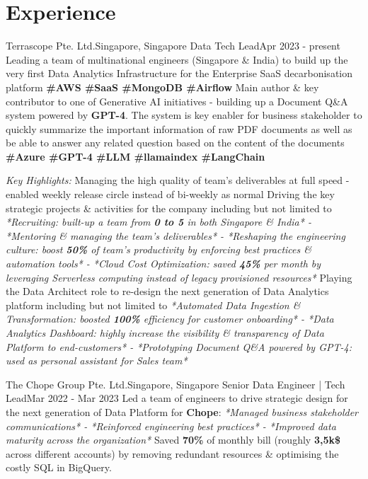 \section{Experience}
  \resumeSubHeadingListStart
    
    \resumeSubheading
      {Terrascope Pte. Ltd.}{Singapore, Singapore}
      {Data Tech Lead}{Apr 2023 - present}
      \resumeItemListStart
          {Leading a team of multinational engineers (Singapore \& India) to build up the very first Data Analytics Infrastructure for the Enterprise SaaS decarbonisation platform \textbf{\scriptsize{\#AWS \#SaaS \#MongoDB \#Airflow}}}
          {Main author \& key contributor to one of Generative AI initiatives - building up a Document Q\&A system powered by \textbf{GPT-4}. The system is key enabler for business stakeholder to quickly summarize the important information of raw PDF documents as well as be able to answer any related question based on the content of the documents \textbf{\scriptsize{\#Azure \#GPT-4 \#LLM \#llamaindex \#LangChain}}}
      \resumeItemListEnd
      
      \emph{Key Highlights:}
      \resumeItemListStart
          {Managing the high quality of team's deliverables at full speed - enabled weekly release circle instead of bi-weekly as normal}
          {Driving the key strategic projects \& activities for the company including but not limited to \emph{*Recruiting: built-up a team from \textbf{0 to 5} in both Singapore \& India* - *Mentoring \& managing the team's deliverables* - *Reshaping the engineering culture: boost \textbf{50\%} of team's productivity by enforcing best practices \& automation tools* - *Cloud Cost Optimization: saved \textbf{45\%} per month by leveraging Serverless computing instead of legacy provisioned resources*}}
          {Playing the Data Architect role to re-design the next generation of Data Analytics platform including but not limited to \emph{*Automated Data Ingestion \& Transformation: boosted \textbf{100\%} efficiency for customer onboarding* - *Data Analytics Dashboard: highly increase the visibility \& transparency of Data Platform to end-customers* - *Prototyping Document Q\&A powered by GPT-4: used as personal assistant for Sales team*}}
      \resumeItemListEnd

    \resumeSubheading
      {The Chope Group Pte. Ltd.}{Singapore, Singapore}
      {Senior Data Engineer | Tech Lead}{Mar 2022 - Mar 2023}
      \resumeItemListStart
          {Led a team of engineers to drive strategic design for the next generation of Data Platform  for \textbf{Chope}: \emph{*Managed business stakeholder communications* - *Reinforced engineering best practices* - *Improved data maturity across the organization*}}
          {Saved \textbf{70\%} of monthly bill (roughly \textbf{3,5k\$} across different accounts) by removing redundant resources \& optimising the costly SQL in BigQuery.}
      \resumeItemListEnd

